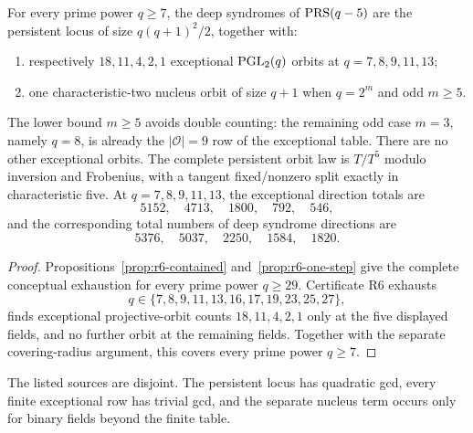 \begin{theorem}\label{thm:r6}%
%
%
%
%
%
%
For every prime power $q\geq7$, the deep syndromes of $\operatorname{PRS}(q-5)$ are
the persistent locus of size $q(q+1)^2/2$, together with:
\begin{enumerate}[label=\textup{(\roman*)}]
\item respectively $18,11,4,2,1$ exceptional $\operatorname{PGL}_2(q)$ orbits at
      $q=7,8,9,11,13$;
\item one characteristic-two nucleus orbit of size $q+1$ when
      $q=2^m$ and odd $m\geq5$.
\end{enumerate}
The lower bound \(m\geq5\) avoids double counting: the remaining odd
case \(m=3\), namely \(q=8\), is already the
\(|\mathcal O|=9\) row of the exceptional table.
There are no other exceptional orbits.  The complete persistent orbit
law is $T/T^5$ modulo inversion and Frobenius, with a tangent
fixed/nonzero split exactly in characteristic five.
At \(q=7,8,9,11,13\), the exceptional direction totals are
\[
                  5152,\quad4713,\quad1800,\quad792,\quad546,
\]
and the corresponding total numbers of deep syndrome directions are
\[
                  5376,\quad5037,\quad2250,\quad1584,\quad1820.
\]
\end{theorem}

\begin{proof}
Propositions~\ref{prop:r6-contained} and~\ref{prop:r6-one-step} give
the complete conceptual exhaustion for every prime power \(q\geq29\).
Certificate R6 exhausts
\[
q\in\{7,8,9,11,13,16,17,19,23,25,27\},
\]
finds exceptional projective-orbit counts $18,11,4,2,1$ only at the
five displayed fields, and no further orbit at the remaining fields.
Together with the separate covering-radius argument, this covers every prime power
$q\geq7$.
\end{proof}

The listed sources are disjoint.  The persistent locus has quadratic
gcd, every finite exceptional row has trivial gcd, and the separate
nucleus term occurs only for binary fields beyond the finite table.


